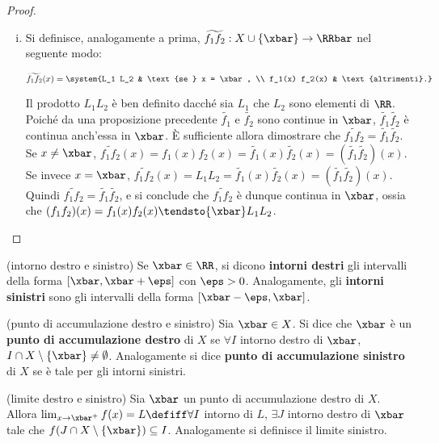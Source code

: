 \documentclass[11pt]{article}
\begin{document}
\begin{proof}
\begin{enumerate}[(i)]
			\item Si definisce, analogamente a prima, $\widetilde{f_1 f_2} : X \cup \{\xbar\} \to \RRbar$ nel seguente modo:
			
			\[ \widetilde{f_1 f_2}(x) = \system{L_1 L_2 & \text{se } x = \xbar, \\ f_1(x) f_2(x) & \text{altrimenti}.} \]
			
			Il prodotto $L_1 L_2$ è ben definito dacché sia $L_1$ che $L_2$ sono elementi di $\RR$.
			Poiché da una proposizione precedente $\tilde{f_1}$ e $\tilde{f_2}$ sono continue in $\xbar$, $\tilde{f_1} \tilde{f_2}$ è continua anch'essa in $\xbar$. È sufficiente allora dimostrare che $\widetilde{f_1 f_2} =
			\tilde{f_1}\tilde{f_2}$. Se $x \neq \xbar$, $\widetilde{f_1 f_2}(x) = f_1(x) f_2(x) = \tilde{f_1}(x) 	\tilde{f_2}(x) = (\tilde{f_1}\tilde{f_2})(x)$. Se invece $x = \xbar$, $\widetilde{f_1 f_2}(x) = L_1 L_2 =
			\tilde{f_1}(x) \tilde{f_2}(x) = (\tilde{f_1} \tilde{f_2})(x)$. Quindi $\widetilde{f_1 f_2} =
			\tilde{f_1} \tilde{f_2}$, e si conclude che $\widetilde{f_1 f_2}$ è dunque continua in $\xbar$, ossia
			che $(f_1 f_2)(x) = f_1(x) f_2(x) \tendsto{\xbar} L_1 L_2$.
		\end{enumerate}
	\end{proof}

	\begin{definition}
		(intorno destro e sinistro) Se $\xbar \in \RR$, si dicono
		\textbf{intorni destri} gli intervalli della forma $[\xbar, \xbar + \eps]$ con
		$\eps > 0$. Analogamente, gli \textbf{intorni sinistri} sono gli
		intervalli della forma $[\xbar - \eps, \xbar]$.
	\end{definition}

	\begin{definition}
		(punto di accumulazione destro e sinistro) Sia $\xbar \in X$.
		Si dice che $\xbar$ è un \textbf{punto di accumulazione destro}
		di $X$ se $\forall I$ intorno destro di $\xbar$, $I \cap X \setminus \{\xbar\} \neq \emptyset$. Analogamente si dice \textbf{punto di
		accumulazione sinistro} di $X$ se è tale per gli intorni sinistri.
	\end{definition}

	\begin{definition}
		(limite destro e sinistro) Sia $\xbar$ un punto di accumulazione
		destro di $X$. Allora $\lim_{x \to \xbar^+} f(x) = L \defiff \forall I$
		intorno di $L$, $\exists J$ intorno destro di $\xbar$ tale che
		$f(J \cap X \setminus \{\xbar\}) \subseteq I$. Analogamente si definisce
		il limite sinistro.
	\end{definition}
\end{document}

